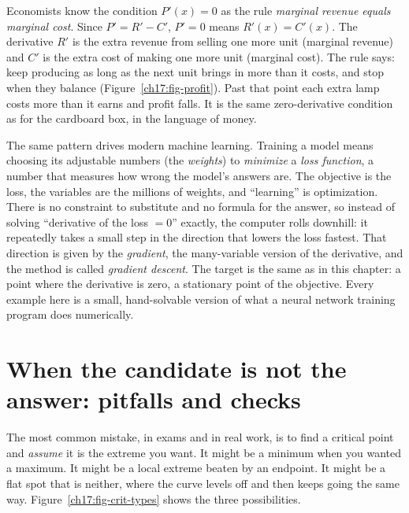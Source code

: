 \begin{applicationbox}
Economists know the condition $P'(x)=0$ as the rule \emph{marginal
revenue equals marginal cost}. Since $P'=R'-C'$, $P'=0$ means $R'(x)=C'(x)$. The
derivative $R'$ is the extra revenue from selling one more unit (marginal revenue) and
$C'$ is the extra cost of making one more unit (marginal cost). The rule says: keep
producing as long as the next unit brings in more than it costs, and stop when
they balance (Figure~\ref{ch17:fig-profit}). Past that point each extra lamp costs more
than it earns and profit falls. It is the same zero-derivative condition as for the
cardboard box, in the language of money.
\end{applicationbox}

\begin{applicationbox}
The same pattern drives modern machine learning. Training a model means choosing
its adjustable numbers (the \emph{weights}) to \emph{minimize} a \emph{loss
function}, a number that measures how wrong the model's answers are. The objective is
the loss, the variables are the millions of weights, and ``learning'' is optimization.
There is no constraint to substitute and no formula for the answer, so instead of
solving ``derivative of the loss $=0$'' exactly, the computer rolls downhill: it
repeatedly takes a small step in the direction that lowers the loss fastest. That
direction is given by the \emph{gradient}, the many-variable version of the
derivative, and the method is called \emph{gradient descent}. The target is the same
as in this chapter: a point where the derivative is zero, a stationary point of the
objective. Every example here is a small, hand-solvable version of what a neural
network training program does numerically.
\end{applicationbox}

\section{When the candidate is not the answer: pitfalls and checks}

The most common mistake, in exams and in real work, is to find a critical point and
\emph{assume} it is the extreme you want. It might be a minimum when you wanted a
maximum. It might be a local extreme beaten by an endpoint. It might be a flat spot
that is neither, where the curve levels off and then keeps going the same way.
Figure~\ref{ch17:fig-crit-types} shows the three possibilities.


